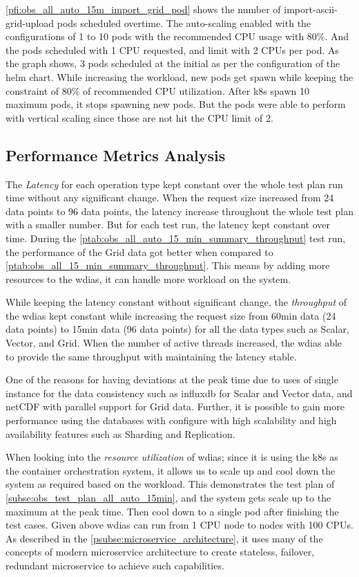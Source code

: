 \documentclass[conference]{IEEEtran}
\begin{document}
\cref{pfi:obs_all_auto_15m_import_grid_pod} shows the number of import-ascii-grid-upload pods scheduled overtime. The auto-scaling enabled with the configurations of 1 to 10 pods with the recommended CPU usage with 80\%. And the pods scheduled with 1 CPU requested, and limit with 2 CPUs per pod.
As the graph shows, 3 pods scheduled at the initial as per the configuration of the helm chart. While increasing the workload, new pods get spawn while keeping the constraint of 80\% of recommended CPU utilization. After \acrshort{k8s} spawn 10 maximum pods, it stops spawning new pods. But the pods were able to perform with vertical scaling since those are not hit the CPU limit of 2.

\subsection{Performance Metrics Analysis}
\label{psubse:performance_metrics}

The \emph{Latency} for each operation type kept constant over the whole test plan run time without any significant change. When the request size increased from 24 data points to 96 data points, the latency increase throughout the whole test plan with a smaller number. But for each test run, the latency kept constant over time.
During the \cref{ptab:obs_all_auto_15_min_summary_throughput} test run, the performance of the Grid data got better when compared to \cref{ptab:obs_all_15_min_summary_throughput}. This means by adding more resources to the \acrshort{wdias}, it can handle more workload on the system.

While keeping the latency constant without significant change, the \emph{throughput} of the \acrshort{wdias} kept constant while increasing the request size from 60min data (24 data points) to 15min data (96 data points) for all the data types such as Scalar, Vector, and Grid.
When the number of active threads increased, the \acrshort{wdias} able to provide the same throughput with maintaining the latency stable.

One of the reasons for having deviations at the peak time due to uses of single instance for the data consistency such as \acrshort{influxdb} for Scalar and Vector data, and netCDF with parallel support for Grid data. Further, it is possible to gain more performance using the databases with configure with high scalability and high availability features such as Sharding and Replication.

When looking into the \emph{resource utilization} of \acrshort{wdias}; since it is using the \acrshort{k8s} as the container orchestration system, it allows us to scale up and cool down the system as required based on the workload. This demonstrates the test plan of \cref{subse:obs_test_plan_all_auto_15min}, and the system gets scale up to the maximum at the peak time. Then cool down to a single pod after finishing the test cases.
Given above \acrshort{wdias} can run from 1 CPU node to nodes with 100 CPUs. As described in the \cref{psubse:microservice_architecture}, it uses many of the concepts of modern microservice architecture to create stateless, failover, redundant microservice to achieve such capabilities.
\end{document}
